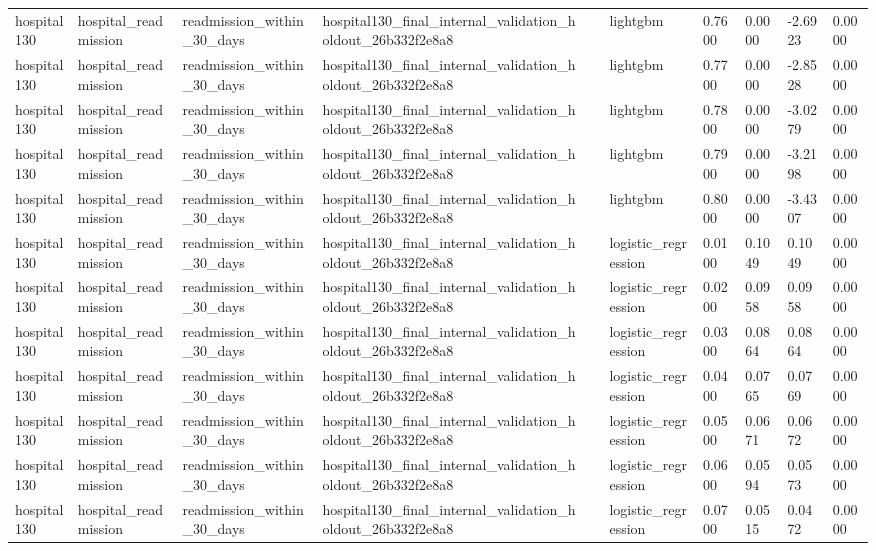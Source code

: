 \begin{tabular}{llllllllll}
hospital130 & hospital\_readmission & readmission\_within\_30\_days & hospital130\_final\_internal\_validation\_holdout\_26b332f2e8a8 &  & lightgbm & 0.7600 & 0.0000 & -2.6923 & 0.0000 \\
hospital130 & hospital\_readmission & readmission\_within\_30\_days & hospital130\_final\_internal\_validation\_holdout\_26b332f2e8a8 &  & lightgbm & 0.7700 & 0.0000 & -2.8528 & 0.0000 \\
hospital130 & hospital\_readmission & readmission\_within\_30\_days & hospital130\_final\_internal\_validation\_holdout\_26b332f2e8a8 &  & lightgbm & 0.7800 & 0.0000 & -3.0279 & 0.0000 \\
hospital130 & hospital\_readmission & readmission\_within\_30\_days & hospital130\_final\_internal\_validation\_holdout\_26b332f2e8a8 &  & lightgbm & 0.7900 & 0.0000 & -3.2198 & 0.0000 \\
hospital130 & hospital\_readmission & readmission\_within\_30\_days & hospital130\_final\_internal\_validation\_holdout\_26b332f2e8a8 &  & lightgbm & 0.8000 & 0.0000 & -3.4307 & 0.0000 \\
hospital130 & hospital\_readmission & readmission\_within\_30\_days & hospital130\_final\_internal\_validation\_holdout\_26b332f2e8a8 &  & logistic\_regression & 0.0100 & 0.1049 & 0.1049 & 0.0000 \\
hospital130 & hospital\_readmission & readmission\_within\_30\_days & hospital130\_final\_internal\_validation\_holdout\_26b332f2e8a8 &  & logistic\_regression & 0.0200 & 0.0958 & 0.0958 & 0.0000 \\
hospital130 & hospital\_readmission & readmission\_within\_30\_days & hospital130\_final\_internal\_validation\_holdout\_26b332f2e8a8 &  & logistic\_regression & 0.0300 & 0.0864 & 0.0864 & 0.0000 \\
hospital130 & hospital\_readmission & readmission\_within\_30\_days & hospital130\_final\_internal\_validation\_holdout\_26b332f2e8a8 &  & logistic\_regression & 0.0400 & 0.0765 & 0.0769 & 0.0000 \\
hospital130 & hospital\_readmission & readmission\_within\_30\_days & hospital130\_final\_internal\_validation\_holdout\_26b332f2e8a8 &  & logistic\_regression & 0.0500 & 0.0671 & 0.0672 & 0.0000 \\
hospital130 & hospital\_readmission & readmission\_within\_30\_days & hospital130\_final\_internal\_validation\_holdout\_26b332f2e8a8 &  & logistic\_regression & 0.0600 & 0.0594 & 0.0573 & 0.0000 \\
hospital130 & hospital\_readmission & readmission\_within\_30\_days & hospital130\_final\_internal\_validation\_holdout\_26b332f2e8a8 &  & logistic\_regression & 0.0700 & 0.0515 & 0.0472 & 0.0000 \\

\end{tabular}
